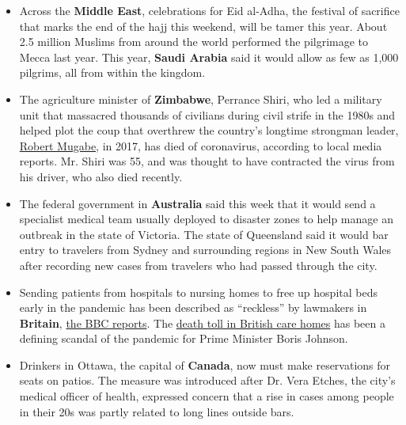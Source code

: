 \begin{itemize}
\item
  Across the \textbf{Middle East}, celebrations for Eid al-Adha, the
  festival of sacrifice that marks the end of the hajj this weekend,
  will be tamer this year. About 2.5 million Muslims from around the
  world performed the pilgrimage to Mecca last year. This year,
  \textbf{Saudi Arabia} said it would allow as few as 1,000 pilgrims,
  all from within the kingdom.
\item
  The agriculture minister of \textbf{Zimbabwe}, Perrance Shiri, who led
  a military unit that massacred thousands of civilians during civil
  strife in the 1980s and helped plot the coup that overthrew the
  country's longtime strongman leader,
  \href{https://www.nytimes.com/2019/09/06/obituaries/robert-mugabe-dead.html}{Robert
  Mugabe}, in 2017, has died of coronavirus, according to local media
  reports. Mr. Shiri was 55, and was thought to have contracted the
  virus from his driver, who also died recently.
\item
  The federal government in \textbf{Australia} said this week that it
  would send a specialist medical team usually deployed to disaster
  zones to help manage an outbreak in the state of Victoria. The state
  of Queensland said it would bar entry to travelers from Sydney and
  surrounding regions in New South Wales after recording new cases from
  travelers who had passed through the city.
\item
  Sending patients from hospitals to nursing homes to free up hospital
  beds early in the pandemic has been described as ``reckless'' by
  lawmakers in \textbf{Britain},
  \href{https://www.bbc.com/news/uk-politics-53574265}{the BBC reports}.
  The
  \href{https://www.nytimes.com/2020/05/25/world/europe/coronavirus-uk-nursing-homes.html}{death
  toll in British care homes} has been a defining scandal of the
  pandemic for Prime Minister Boris Johnson.
\item
  Drinkers in Ottawa, the capital of \textbf{Canada}, now must make
  reservations for seats on patios. The measure was introduced after Dr.
  Vera Etches, the city's medical officer of health, expressed concern
  that a rise in cases among people in their 20s was partly related to
  long lines outside bars.
\end{itemize}

\hypertarget{-12}{%
\subsection{}\label{-12}}


